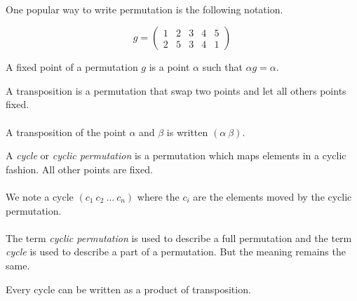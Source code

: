 \paragraph{}
One popular way to write permutation is the following notation.

\[
  g =
  \left(
    \begin{array}{ccccc}
      1 & 2 & 3 & 4 & 5\\
      2 & 5 & 3 & 4 & 1
    \end{array}
  \right)
\]

\begin{definition}
  A fixed point of a permutation $g$ is a point $\alpha$ such that $\alpha g = \alpha$.
\end{definition}

\begin{definition}[Transposition]
  A transposition is a permutation that swap two points and let all others points fixed.
\end{definition}

\paragraph{}
A transposition of the point $\alpha$ and $\beta$ is written $(\alpha\ \beta)$.

\begin{definition}[Cycle]
  A \textit{cycle} or \textit{cyclic permutation} is a permutation which maps elements in a cyclic fashion. All other points are fixed.
\end{definition}

\paragraph{}
We note a cycle $(c_1\ c_2\ \dots\ c_n)$ where the $c_i$ are the elements moved by the cyclic permutation.

\paragraph{}
The term \textit{cyclic permutation} is used to describe a full permutation and the term \textit{cycle} is used to describe a part of a permutation. But the meaning remains the same.

\begin{proposition}
  Every cycle can be written as a product of transposition.
\end{proposition}

